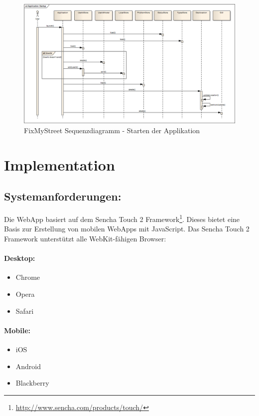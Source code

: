 \begin{figure}[H]
	\centering
	\includegraphics[scale=0.43]{images/usecase2-fixmystreet/uml/fixmystreet-sequencediagram-applicationstartup.png}
	\caption{FixMyStreet Sequenzdiagramm - Starten der Applikation}
	\label{fixmystreet-sequencediagram-applicationstartup}
\end{figure}

\section{Implementation}
\subsection{Systemanforderungen:}
Die WebApp basiert auf dem Sencha Touch 2 Framework\footnote{\url{http://www.sencha.com/products/touch/}}. Dieses bietet eine Basis zur Erstellung von mobilen WebApps mit JavaScript. Das Sencha Touch 2 Framework unterstützt alle WebKit-fähigen Browser:

\paragraph{Desktop:}
\begin{itemize}
\item Chrome
\item Opera
\item Safari
\end{itemize}

\paragraph{Mobile:}
\begin{itemize}
\item iOS
\item Android
\item Blackberry
\end{itemize}

